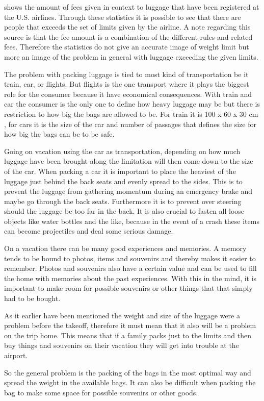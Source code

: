 \citep{airstat} shows the amount of fees given in context to luggage that have been registered at the U.S. airlines. Through these statistics it is possible to see that there are people that exceeds the set of limits given by the airline. A note regarding this source is that the fee amount is a combination of the different rules and related fees. Therefore the statistics do not give an accurate image of weight limit but more an image of the problem in general with luggage exceeding the given limits.

The problem with packing luggage is tied to most kind of transportation be it train, car, or flights. But flights is the one transport where it plays the biggest role for the consumer because it have economical consequences. With train and car the consumer is the only one to define how heavy luggage may be but there is restriction to how big the bags are allowed to be. For train it is 100 x 60 x 30 cm \citep{rulestrain}, for cars it is the size of the car and number of passages that defines the size for how big the bags can be to be safe.

Going on vacation using the car as transportation, depending on how much luggage have been brought along the limitation will then come down to the size of the car. When packing a car it is important to place the heaviest of the luggage just behind the back seats and evenly spread to the sides. This is to prevent the luggage from gathering momentum during an emergency brake and maybe go through the back seats. Furthermore it is to prevent over steering should the luggage be too far in the back. It is also crucial to fasten all loose objects like water bottles and the like, because in the event of a crash these items can become projectiles and deal some serious damage\citep{Farlig_bagage}.

On a vacation there can be many good experiences and memories. A memory tends to be bound to photos, items and souvenirs and thereby makes it easier to remember. Photos and souvenirs also have a certain value and can be used to fill the home with memories about the past experiences.
With this in the mind, it is important to make room for possible souvenirs or other things that that simply had to be bought.

As it earlier have been mentioned the weight and size of the luggage were a problem before the takeoff, therefore it must mean that it also will be a problem on the trip home.
This means that if a family packs just to the limits and then buy things and souvenirs on their vacation they will get into trouble at the airport.

So the general problem is the packing of the bags in the most optimal way and spread the weight in the available bags. It can also be difficult when packing the bag to make some space for possible souvenirs or other goods.